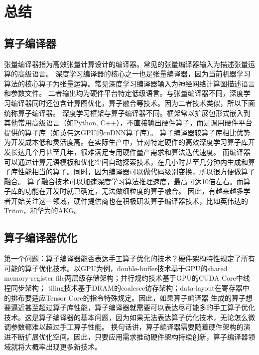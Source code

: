
\chapter{总结}

\section{算子编译器}
张量编译器指为高效张量计算设计的编译器\cite{halide,kjolstad:2017:taco}。常见的张量编译器输入为描述张量运算的高级语言。
深度学习编译器\cite{tvm,rammer}的核心之一也是张量编译器，因为当前机器学习算法的核心算子为张量运算。常见深度学习编译器输入为神经网络计算图描述语言和参数文件。
二者输出均为硬件平台特定低级语言。与张量编译器不同，深度学习编译器同时还包含计算图优化，算子融合等技术。因为二者技术类似，所以下面统称算子编译器。
深度学习框架\cite{tensorflow,pytorch}与算子编译器不同。框架常以扩展包形式嵌入到其他常用高级语言（如Python, C++），不直接输出硬件算子，而是调用硬件平台提供的算子库（如英伟达GPU的cuDNN算子库\cite{cuDNN}）。
算子编译器较算子库相比优势为开发成本低和灵活度高。在实际生产中，针对特定硬件的高效深度学习算子库开发长达几个月甚至几年，很难满足专用硬件量产需求和算法迭代速度\cite{Heron}。
而编译器可以通过计算元语模板和优化空间自动探索技术，在几小时甚至几分钟内生成和算子库性能相当的算子\cite{Roller}。同时，因为编译器可以做代码级别变换，所以很方便做算子融合。
算子融合技术可以加速深度学习算法推理速度，最高可达10倍左右\cite{DNNFusion}。而算子库的功能在开发时就已确定，无法做细粒度的算子融合\cite{Graphene}。
因此，有越来越多学者开始关注这一领域\cite{PET,Tiramisu,Checkmate}，硬件提供商也在积极研发算子编译器技术，比如英伟达的Triton\cite{Triton}，和华为的AKG\cite{AKG}。

\section{算子编译器优化}
第一个问题：算子编译器能否表达手工算子优化的技术？硬件架构特性规定了所有可能的算子优化技术。以GPU为例，double-buffer技术基于GPU的shared memory-register file两层级存储架构\cite{double-buffer}；并行规约技术基于GPU的CUDA Core中线程同步架构\cite{parallel-reduction}；
tiling技术基于DRAM的coalesce访存架构\cite{coalesce}；data-layout在寄存器中的排布要适应Tensor Core的指令特殊规定\cite{DynamicNM}。因此，如果算子编译器
生成的算子想要逼近甚至超过算子库性能，算子编译器就需要可以表达尽可能多的手工算子优化技术。这是算子编译器的基本问题，因为如果无法表达算子优化技术，无论怎么微调参数都难以超过手工算子性能。
换句话讲，算子编译器需要随着硬件架构的演进不断扩展优化空间。因此，只要应用需求推动硬件架构持续创新，算子编译器领域就将大概率出现更多新技术。

